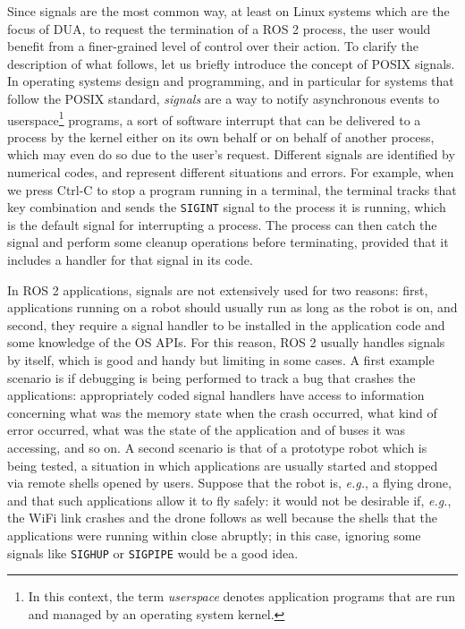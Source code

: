 Since signals are the most common way, at least on Linux systems which are the focus of DUA, to request the termination of a ROS 2 process, the user would benefit from a finer-grained level of control over their action. To clarify the description of what follows, let us briefly introduce the concept of POSIX signals. In operating systems design and programming, and in particular for systems that follow the POSIX standard, \emph{signals} are a way to notify asynchronous events to userspace\footnote{In this context, the term \emph{userspace} denotes application programs that are run and managed by an operating system kernel.} programs, a sort of software interrupt that can be delivered to a process by the kernel either on its own behalf or on behalf of another process, which may even do so due to the user's request. Different signals are identified by numerical codes, and represent different situations and errors. For example, when we press Ctrl-C to stop a program running in a terminal, the terminal tracks that key combination and sends the \texttt{SIGINT} signal to the process it is running, which is the default signal for interrupting a process. The process can then catch the signal and perform some cleanup operations before terminating, provided that it includes a handler for that signal in its code.

In ROS 2 applications, signals are not extensively used for two reasons: first, applications running on a robot should usually run as long as the robot is on, and second, they require a signal handler to be installed in the application code and some knowledge of the OS APIs. For this reason, ROS 2 usually handles signals by itself, which is good and handy but limiting in some cases. A first example scenario is if debugging is being performed to track a bug that crashes the applications: appropriately coded signal handlers have access to information concerning what was the memory state when the crash occurred, what kind of error occurred, what was the state of the application and of buses it was accessing, and so on. A second scenario is that of a prototype robot which is being tested, a situation in which applications are usually started and stopped via remote shells opened by users. Suppose that the robot is, \emph{e.g.}, a flying drone, and that such applications allow it to fly safely: it would not be desirable if, \emph{e.g.}, the WiFi link crashes and the drone follows as well because the shells that the applications were running within close abruptly; in this case, ignoring some signals like \texttt{SIGHUP} or \texttt{SIGPIPE} would be a good idea.

